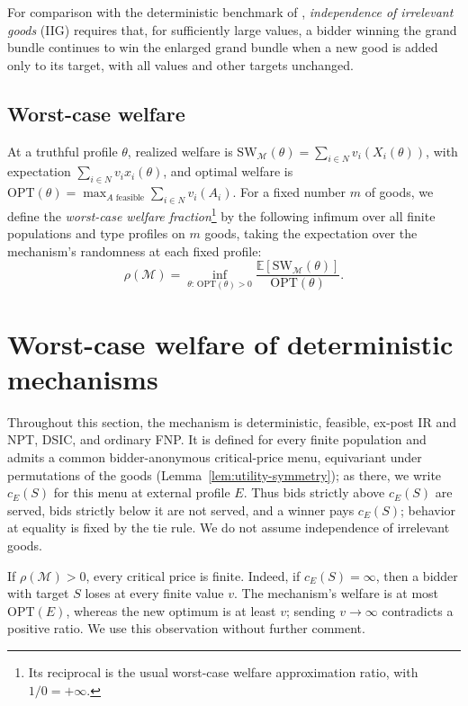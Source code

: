 \documentclass[format=acmsmall, review=false]{acmart}
\newcommand{\OPT}{\mathrm{OPT}}
\begin{document}
For comparison with the deterministic benchmark of
\cite[Definition~2]{iwasaki2010worst}, \emph{independence of
irrelevant goods} (IIG) requires that, for sufficiently large
values, a bidder winning the grand bundle continues to win the
enlarged grand bundle when a new good is added only to its
target, with all values and other targets unchanged.

\subsection{Worst-case welfare}

At a truthful profile $\theta$, realized welfare is
$\mathrm{SW}_{\mathcal M}(\theta)=\sum_{i\in N}v_i(X_i(\theta))$,
with expectation $\sum_{i\in N}v_i x_i(\theta)$, and optimal
welfare is
$\mathrm{OPT}(\theta)=\max_{A\text{ feasible}}\sum_{i\in N}v_i(A_i)$.
For a fixed number $m$ of goods, we define the
\emph{worst-case welfare fraction}\footnote{Its reciprocal is
the usual worst-case welfare approximation ratio, with
$1/0=+\infty$.} by the following infimum over all finite
populations and type profiles on $m$ goods, taking the
expectation over the mechanism's randomness at each fixed
profile:
\[
\rho(\mathcal M)
=
\inf_{\theta:\,\mathrm{OPT}(\theta)>0}
\frac{\mathbb{E}[\mathrm{SW}_{\mathcal M}(\theta)]}
     {\mathrm{OPT}(\theta)}.
\]
\section{Worst-case welfare of deterministic mechanisms}
\label{sec:deterministic}

Throughout this section, the mechanism is deterministic, feasible,
ex-post IR and NPT, DSIC, and ordinary FNP.  It is defined for
every finite population and admits a common bidder-anonymous critical-price
menu, equivariant under permutations of the goods
(Lemma~\ref{lem:utility-symmetry}); as there, we write $c_E(S)$ for this menu at
external profile $E$.  Thus bids strictly above $c_E(S)$ are served, bids
strictly below it are not served, and a winner pays $c_E(S)$; behavior
at equality is fixed by the tie rule.  We do not assume independence of
irrelevant goods.

If $\rho(\mathcal M)>0$, every critical price is finite.  Indeed, if
$c_E(S)=\infty$, then a bidder with target $S$ loses at every finite
value $v$.  The mechanism's welfare is at most $\OPT(E)$, whereas the new
optimum is at least $v$; sending $v\to\infty$ contradicts a positive ratio.
We use this observation without further comment.
\end{document}
